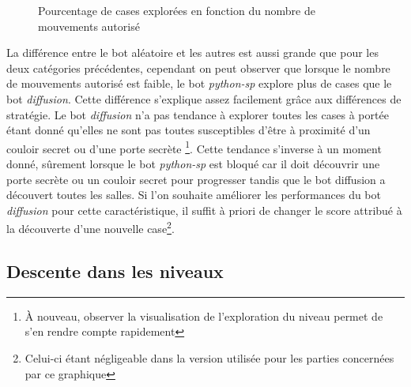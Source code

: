 \documentclass[a4paper,12pt]{article}
\begin{document}
\begin{figure}[H]
  \caption{\label{fig:squares_explored} Pourcentage de cases explorées en
    fonction du nombre de mouvements autorisé}
\end{figure}

La différence entre le bot aléatoire et les autres est aussi grande que pour les
deux catégories précédentes, cependant on peut observer que lorsque le nombre de
mouvements autorisé est faible, le bot {\em python-sp} explore plus de cases que
le bot {\em diffusion}. Cette différence s'explique assez facilement grâce aux
différences de stratégie. Le bot {\em diffusion} n'a pas tendance à explorer
toutes les cases à portée étant donné qu'elles ne sont pas toutes susceptibles
d'être à proximité d'un couloir secret ou d'une porte secrète \footnote{À
  nouveau, observer la visualisation de l'exploration du niveau permet de s'en
  rendre compte rapidement}. Cette tendance s'inverse à un moment donné,
sûrement lorsque le bot {\em python-sp} est bloqué car il doit découvrir une
porte secrète ou un couloir secret pour progresser tandis que le bot diffusion a
découvert toutes les salles. Si l'on souhaite améliorer les performances du bot
{\em diffusion} pour cette caractéristique, il suffit à priori de changer le
score attribué à la découverte d'une nouvelle case\footnote{Celui-ci étant
négligeable dans la version utilisée pour les parties concernées par ce
graphique}.

\subsection{Descente dans les niveaux}
\end{document}
